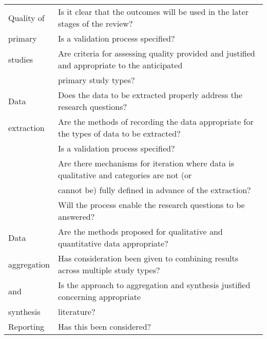 \begin{table}[H]
\begin{center}
{\begin{tabular}{|l||l|}
                    \hline
                    Quality of  & Is it clear that the outcomes will be used in the later stages of the review?              \\
                    primary     & Is a validation process specified?                                                         \\
                    studies     & Are criteria for assessing quality provided and justified and appropriate to the anticipated\\ 
                                & primary study types?                                                                       \\
                    \hline
                    Data        & Does the data to be extracted properly address the research questions?                     \\
                    extraction  & Are the methods of recording the data appropriate for the types of data to be extracted?   \\
                                & Is a validation process specified?                                                         \\
                                & Are there mechanisms for iteration where data is qualitative and categories are not (or    \\
                                & cannot be) fully defined in advance of the extraction?                                     \\
                                & Will the process enable the research questions to be answered?                             \\
                    \hline
                    Data        & Are the methods proposed for qualitative and quantitative data appropriate?                \\
                    aggregation & Has consideration been given to combining results across multiple study types?             \\
                    and         & Is the approach to aggregation and synthesis justified concerning appropriate              \\
                    synthesis   & literature?                                                                                \\
                    \hline
                    Reporting   & Has this been considered?                                                                  \\

\end{tabular}}
\end{center}
\end{table}
